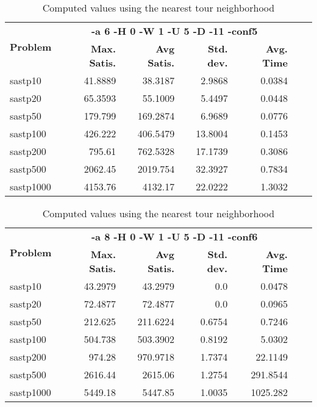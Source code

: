 \documentclass{article}
\begin{document}
\begin{table}[b!]
  \vspace{-6mm}%
  \caption{Computed values using the nearest tour neighborhood}
  \label{tab:NearestTour}
  \setlength{\tabcolsep}{1.4mm}
  \centering
  \begin{tabular}{lrrrrrr}
   \multirow{2}{*}{\bfseries Problem} &
      \multicolumn{4}{c}{\bfseries -a 6 -H 0 -W 1 -U 5 -D -11 -conf5 } \\
    &
    \bfseries Max. Satis. &
    \bfseries Avg Satis. &
    \bfseries Std. dev. &
    \bfseries Avg. Time 
    \\\hline
   sastp10 & 41.8889 & 38.3187 & 2.9868 & 0.0384 \\ 
sastp20 & 65.3593 & 55.1009 & 5.4497 & 0.0448 \\ 
sastp50 & 179.799 & 169.2874 & 6.9689 & 0.0776 \\ 
sastp100 & 426.222 & 406.5479 & 13.8004 & 0.1453 \\ 
sastp200 & 795.61 & 762.5328 & 17.1739 & 0.3086 \\ 
sastp500 & 2062.45 & 2019.754 & 32.3927 & 0.7834 \\ 
sastp1000 & 4153.76 & 4132.17 & 22.0222 & 1.3032
    \\\hline
  \end{tabular}

\end{table}


\begin{table}[b!]
  \vspace{-6mm}%
  \caption{Computed values using the nearest tour neighborhood}
  \label{tab:NearestTour}
  \setlength{\tabcolsep}{1.4mm}
  \centering
  \begin{tabular}{lrrrrrr}
   \multirow{2}{*}{\bfseries Problem} &
      \multicolumn{4}{c}{\bfseries -a 8 -H 0 -W 1 -U 5 -D -11 -conf6 } \\
    &
    \bfseries Max. Satis. &
    \bfseries Avg Satis. &
    \bfseries Std. dev. &
    \bfseries Avg. Time 
    \\\hline
sastp10 & 43.2979 & 43.2979 & 0.0 & 0.0478 \\ 
sastp20 & 72.4877 & 72.4877 & 0.0 & 0.0965 \\ 
sastp50 & 212.625 & 211.6224 & 0.6754 & 0.7246 \\ 
sastp100 & 504.738 & 503.3902 & 0.8192 & 5.0302 \\ 
sastp200 & 974.28 & 970.9718 & 1.7374 & 22.1149 \\ 
sastp500 & 2616.44 & 2615.06 & 1.2754 & 291.8544 \\ 
sastp1000 & 5449.18 & 5447.85 & 1.0035 & 1025.282
    \\\hline
  \end{tabular}

\end{table}
\end{document}
